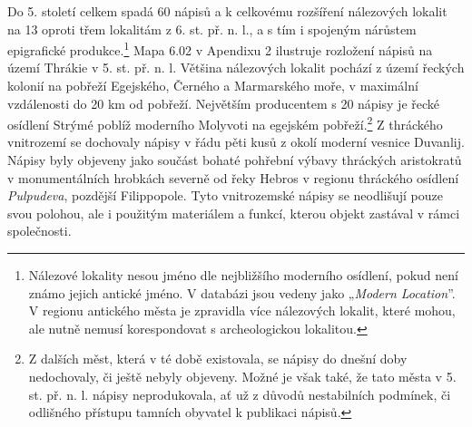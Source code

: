 Do 5. století celkem spadá 60 nápisů a k celkovému rozšíření nálezových lokalit na 13 oproti třem lokalitám z 6. st. př. n. l., a s tím i spojeným nárůstem epigrafické produkce.\footnote{Nálezové lokality nesou jméno dle nejbližšího moderního osídlení, pokud není známo jejich antické jméno. V databázi jsou vedeny jako „{\em Modern Location}”. V regionu antického města je zpravidla více nálezových lokalit, které mohou, ale nutně nemusí korespondovat s archeologickou lokalitou.} Mapa 6.02 v Apendixu 2 ilustruje rozložení nápisů na území Thrákie v 5. st. př. n. l. Většina nálezových lokalit pochází z území řeckých kolonií na pobřeží Egejského, Černého a Marmarského moře, v maximální vzdálenosti do 20 km od pobřeží. Největším producentem s 20 nápisy je řecké osídlení Strýmé poblíž moderního Molyvoti na egejském pobřeží.\footnote{Z dalších měst, která v té době existovala, se nápisy do dnešní doby nedochovaly, či ještě nebyly objeveny. Možné je však také, že tato města v 5. st. př. n. l. nápisy neprodukovala, ať už z důvodů nestabilních podmínek, či odlišného přístupu tamních obyvatel k publikaci nápisů.} Z thráckého vnitrozemí se dochovaly nápisy v řádu pěti kusů z okolí moderní vesnice Duvanlij. Nápisy byly objeveny jako součást bohaté pohřební výbavy thráckých aristokratů v monumentálních hrobkách severně od řeky Hebros v regionu thráckého osídlení {\em Pulpudeva}, pozdější Filippopole. Tyto vnitrozemské nápisy se neodlišují pouze svou polohou, ale i použitým materiálem a funkcí, kterou objekt zastával v rámci společnosti.

